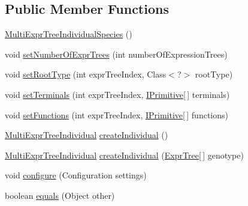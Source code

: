 \subsection*{Public Member Functions}
\begin{DoxyCompactItemize}
\item 
\hyperlink{classnet_1_1sf_1_1jclec_1_1multiexprtree_1_1_multi_expr_tree_individual_species_aaf4054172a3a95d3ee564d94836d8872}{Multi\-Expr\-Tree\-Individual\-Species} ()
\item 
void \hyperlink{classnet_1_1sf_1_1jclec_1_1multiexprtree_1_1_multi_expr_tree_individual_species_a2f9402dd8caaf20f68368feb6a2b2c45}{set\-Number\-Of\-Expr\-Trees} (int number\-Of\-Expression\-Trees)
\item 
void \hyperlink{classnet_1_1sf_1_1jclec_1_1multiexprtree_1_1_multi_expr_tree_individual_species_ab722f255745069fd3e5396f3b688c1f0}{set\-Root\-Type} (int expr\-Tree\-Index, Class$<$?$>$ root\-Type)
\item 
void \hyperlink{classnet_1_1sf_1_1jclec_1_1multiexprtree_1_1_multi_expr_tree_individual_species_a9075a1963184eb71ac7ac153468e1e2d}{set\-Terminals} (int expr\-Tree\-Index, \hyperlink{interfacenet_1_1sf_1_1jclec_1_1exprtree_1_1_i_primitive}{I\-Primitive}\mbox{[}$\,$\mbox{]} terminals)
\item 
void \hyperlink{classnet_1_1sf_1_1jclec_1_1multiexprtree_1_1_multi_expr_tree_individual_species_a0df188de4c3b1cffeabdcffca220ca8d}{set\-Functions} (int expr\-Tree\-Index, \hyperlink{interfacenet_1_1sf_1_1jclec_1_1exprtree_1_1_i_primitive}{I\-Primitive}\mbox{[}$\,$\mbox{]} functions)
\item 
\hyperlink{classnet_1_1sf_1_1jclec_1_1multiexprtree_1_1_multi_expr_tree_individual}{Multi\-Expr\-Tree\-Individual} \hyperlink{classnet_1_1sf_1_1jclec_1_1multiexprtree_1_1_multi_expr_tree_individual_species_a3a96f10033592ecc5c0509e09c56635a}{create\-Individual} ()
\item 
\hyperlink{classnet_1_1sf_1_1jclec_1_1multiexprtree_1_1_multi_expr_tree_individual}{Multi\-Expr\-Tree\-Individual} \hyperlink{classnet_1_1sf_1_1jclec_1_1multiexprtree_1_1_multi_expr_tree_individual_species_add3cca51e1ca70f20b8a331294779839}{create\-Individual} (\hyperlink{classnet_1_1sf_1_1jclec_1_1exprtree_1_1_expr_tree}{Expr\-Tree}\mbox{[}$\,$\mbox{]} genotype)
\item 
void \hyperlink{classnet_1_1sf_1_1jclec_1_1multiexprtree_1_1_multi_expr_tree_individual_species_a8bcb6a9587a3d52adaa51d3a56ceb046}{configure} (Configuration settings)
\item 
boolean \hyperlink{classnet_1_1sf_1_1jclec_1_1multiexprtree_1_1_multi_expr_tree_individual_species_a94ef9f97205fbd8497ea9647e2cd51cd}{equals} (Object other)
\end{DoxyCompactItemize}
